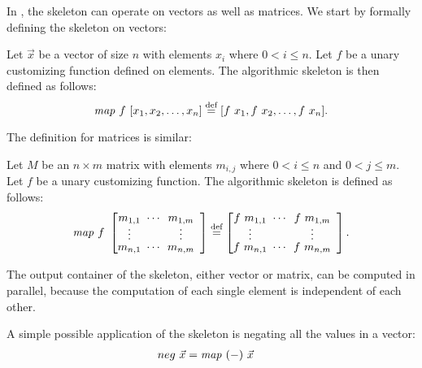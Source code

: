 In \SkelCL, the \map skeleton can operate on vectors as well as matrices.
We start by formally defining the skeleton on vectors:
\begin{definition}
  \label{definition:map}
  Let $\vec{x}$ be a vector of size $n$ with elements $x_i$ where $0 < i \leq n$.
  Let $f$ be a unary customizing function defined on elements.
  The algorithmic skeleton \map is then defined as follows:
  \begin{equation*}
    \map\ f\ [x_1, x_2, \dots, x_n] \eqdef [f\ x_1, f\ x_2, \dots, f\ x_n] .
  \end{equation*}
\end{definition}
\noindent
The definition for matrices is similar:
\begin{definition}
  \label{definition:map:matrix}
  Let $M$ be an $n\times m$ matrix with elements $m_{i,j}$ where $0 < i \leq n$ and $0 < j \leq m$.
  Let $f$ be a unary customizing function.
  The algorithmic skeleton \map is defined as follows:
  \begin{equation*}
    \map\ f\ \DottedMatrix{m_{1,1}}{m_{1,m}}{m_{n,1}}{m_{n,m}}
      \eqdef \DottedMatrix{f\ m_{1,1}}{f\ m_{1,m}}{f\ m_{n,1}}{f\ m_{n,m}} .
  \end{equation*} 
\end{definition}
\noindent
The output container of the \map skeleton, either vector or matrix, can be computed in parallel, because the computation of each single element is independent of each other.

A simple possible application of the \map skeleton is negating all the values in a vector:
\begin{align*}
  neg\ \vec{x} &= \text{\textit{map}}\ (-)\ \vec{x}
\end{align*}


